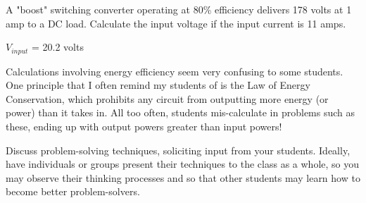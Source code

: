 

A "boost" switching converter operating at 80\% efficiency delivers 178 volts at 1 amp to a DC load.  Calculate the input voltage if the input current is 11 amps.  







$V_{input}$ = 20.2 volts







Calculations involving energy efficiency seem very confusing to some students.  One principle that I often remind my students of is the Law of Energy Conservation, which prohibits any circuit from outputting more energy (or power) than it takes in.  All too often, students mis-calculate in problems such as these, ending up with output powers greater than input powers!  

Discuss problem-solving techniques, soliciting input from your students.  Ideally, have individuals or groups present their techniques to the class as a whole, so you may observe their thinking processes and so that other students may learn how to become better problem-solvers.




